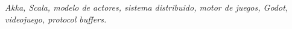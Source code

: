 \textit{
    Akka, Scala, modelo de actores, sistema distribuido, motor de juegos, Godot,
    videojuego, protocol buffers.
}
